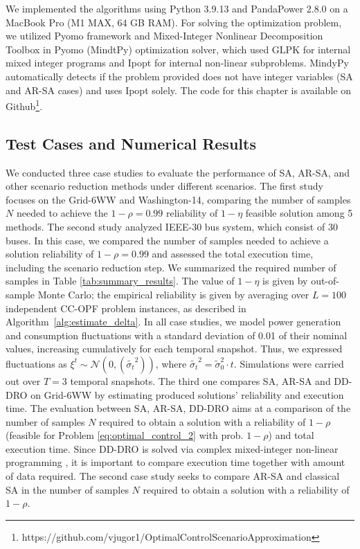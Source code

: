 We implemented the algorithms using Python 3.9.13 and PandaPower 2.8.0 \cite{pandapower.2018} on a MacBook Pro (M1 MAX, 64 GB RAM). For solving the optimization problem, we utilized Pyomo framework \cite{hart2017pyomo} and Mixed-Integer Nonlinear Decomposition Toolbox in Pyomo (MindtPy)   \cite{bernal2018mixed} optimization solver, which used GLPK \cite{Oki2012GLPKL} for internal mixed integer programs and Ipopt \cite{wachter2006implementation} for internal non-linear subproblems. MindyPy automatically detects if the problem provided does not have integer variables (SA and AR-SA cases) and uses Ipopt solely. 
The code for this chapter is available on Github\footnote{https://github.com/vjugor1/OptimalControlScenarioApproximation}.
\subsection{Test Cases and Numerical Results}
We conducted three case studies to evaluate the performance of SA, AR-SA, and other scenario reduction methods under different scenarios.  The first study focuses on the Grid-6WW and Washington-14, comparing the number of samples $N$ needed to achieve the $1-\rho=0.99$ reliability of $1-\eta$ feasible solution among 5 methods. 
The second study analyzed IEEE-30 bus system, which consist of 30 buses. 
In this case, we compared the number of samples needed to achieve a solution reliability of $1-\rho=0.99$ and assessed the total execution time, including the scenario reduction step. We summarized the required number of samples in Table \ref{tab:summary_results}. The value of $1-\eta$ is given by out-of-sample Monte Carlo; the empirical reliability is given by averaging over $L=100$ independent CC-OPF problem instances, as described in Algorithm~\ref{alg:estimate_delta}.
%
In all case studies, we model power generation and consumption fluctuations with a standard deviation of 0.01 of their nominal values, increasing cumulatively for each temporal snapshot. Thus, we expressed fluctuations as $\xi^t \sim \mathcal{N}(0, (\tilde{\sigma_t}^2))$, where $\tilde{\sigma_t}^2 = \tilde{\sigma}_0^2 \cdot t$. Simulations were carried out over $T=3$ temporal snapshots.%
The third one compares SA, AR-SA and DD-DRO on Grid-6WW by estimating produced solutions' reliability and execution time.
The evaluation between SA, AR-SA, DD-DRO aims at a comparison of the number of samples $N$ required to obtain a solution with a reliability of $1-\rho$ (feasible for Problem \eqref{eq:optimal_control_2} with prob. $1-\rho$) and total execution time. Since DD-DRO is solved via complex mixed-integer non-linear programming \cite{chen2024data}, it is important to compare execution time together with amount of data required.
The second case study seeks to compare AR-SA and classical SA in the number of samples $N$ required to obtain a solution with a reliability of $1-\rho$.%

